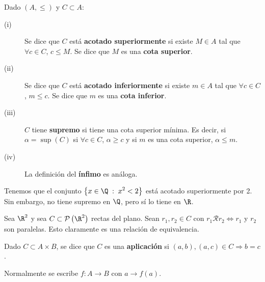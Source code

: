 \begin{fdefinition}[]
\normalfont Dado $\displaystyle \left(A, \leq \right) $ y $\displaystyle C \subset A $:
\begin{description}
\item[(i)] Se dice que $\displaystyle C $ está \textbf{acotado superiormente} si existe $\displaystyle M \in A $ tal que $\displaystyle \forall c \in C $, $\displaystyle c \leq M $. Se dice que $\displaystyle M $ es una \textbf{cota superior}.
\item[(ii)] Se dice que $\displaystyle C $ está \textbf{acotado inferiormente} si existe $\displaystyle m \in A $ tal que $\displaystyle \forall c \in C $, $\displaystyle m \leq c $. Se dice que $\displaystyle m $ es una \textbf{cota inferior}.
\item[(iii)] $\displaystyle C $ tiene \textbf{supremo} si tiene una cota superior mínima. Es decir, si $\displaystyle \alpha = \sup\left(C\right) $ si $\displaystyle \forall c \in C $, $\displaystyle \alpha \geq c $ y si $\displaystyle m $ es una cota superior, $\displaystyle \alpha \leq m $.
\item[(iv)] La definición del \textbf{ínfimo} es análoga.
\end{description}
\end{fdefinition}

\begin{eg}
	\normalfont Tenemos que el conjunto $\displaystyle \left\{ x \in \Q \; : \; x^{2} < 2\right\}  $ está acotado superiormente por 2. Sin embargo, no tiene supremo en $\displaystyle \Q $, pero sí lo tiene en $\displaystyle \R $.
\end{eg}

\begin{eg}
\normalfont Sea $\displaystyle \R^{2} $ y sea $\displaystyle C \subset \mathcal{P}\left(\R^{2}\right) $ rectas del plano. Sean $\displaystyle r_{1}, r_{2} \in C $ con $\displaystyle r_{1}\mathcal{R}r_{2} \iff r_{1} $ y $\displaystyle r_{2} $ son paralelas. Esto claramente es una relación de equivalencia. 
\end{eg}

\begin{fdefinition}[Aplicación]
\normalfont Dado $\displaystyle C \subset A \times B $, se dice que $\displaystyle C $ es una \textbf{aplicación} si $\displaystyle \left(a,b\right), \left(a,c\right) \in C \Rightarrow b = c $.
\end{fdefinition}

\begin{notation}
\normalfont Normalmente se escribe $\displaystyle f : A \to B $ con $\displaystyle a \to f\left(a\right) $.
\end{notation}

